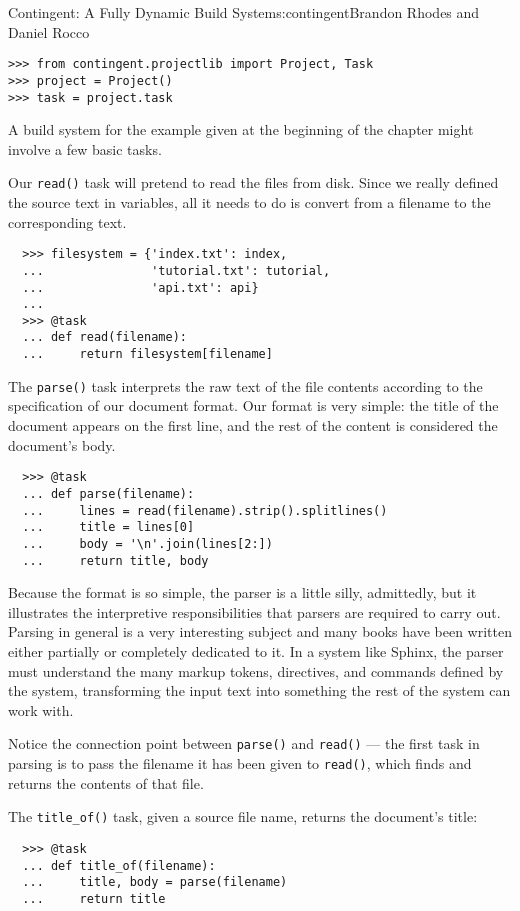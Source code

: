 \begin{aosachapter}{Contingent: A Fully Dynamic Build System}{s:contingent}{Brandon Rhodes and Daniel Rocco}
\begin{verbatim}
>>> from contingent.projectlib import Project, Task
>>> project = Project()
>>> task = project.task
\end{verbatim}

A build system for the example given at the beginning of the chapter
might involve a few basic tasks.

Our \texttt{read()} task will pretend to read the files from disk. Since
we really defined the source text in variables, all it needs to do is
convert from a filename to the corresponding text.

\begin{verbatim}
  >>> filesystem = {'index.txt': index,
  ...               'tutorial.txt': tutorial,
  ...               'api.txt': api}
  ...
  >>> @task
  ... def read(filename):
  ...     return filesystem[filename]
\end{verbatim}

The \texttt{parse()} task interprets the raw text of the file contents
according to the specification of our document format. Our format is
very simple: the title of the document appears on the first line, and
the rest of the content is considered the document's body.

\begin{verbatim}
  >>> @task
  ... def parse(filename):
  ...     lines = read(filename).strip().splitlines()
  ...     title = lines[0]
  ...     body = '\n'.join(lines[2:])
  ...     return title, body
\end{verbatim}

Because the format is so simple, the parser is a little silly,
admittedly, but it illustrates the interpretive responsibilities that
parsers are required to carry out. Parsing in general is a very
interesting subject and many books have been written either partially or
completely dedicated to it. In a system like Sphinx, the parser must
understand the many markup tokens, directives, and commands defined by
the system, transforming the input text into something the rest of the
system can work with.

Notice the connection point between \texttt{parse()} and \texttt{read()}
--- the first task in parsing is to pass the filename it has been given
to \texttt{read()}, which finds and returns the contents of that file.

The \texttt{title\_of()} task, given a source file name, returns the
document's title:

\begin{verbatim}
  >>> @task
  ... def title_of(filename):
  ...     title, body = parse(filename)
  ...     return title
\end{verbatim}


\end{aosachapter}
